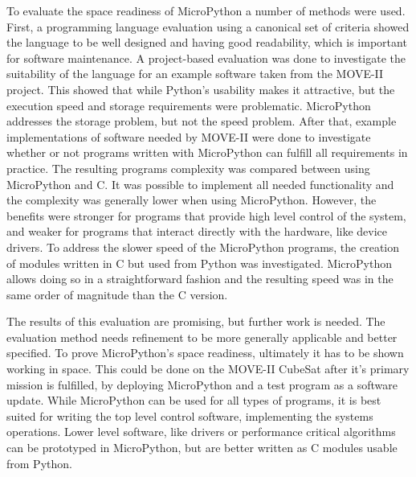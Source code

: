 To evaluate the space readiness of MicroPython a number of methods were used. First, a programming language evaluation using a canonical set of criteria showed the language to be well designed and having good readability, which is important for software maintenance. A project-based evaluation was done to investigate the suitability of the language for an example software taken from the MOVE-II project. This showed that while Python's usability makes it attractive, but the execution speed and storage requirements were problematic. MicroPython addresses the storage problem, but not the speed problem. After that, example implementations of software needed by MOVE-II were done to investigate whether or not programs written with MicroPython can fulfill all requirements in practice. The resulting programs complexity was compared between using MicroPython and C. It was possible to implement all needed functionality and the complexity was generally lower when using MicroPython. However, the benefits were stronger for programs that provide high level control of the system, and weaker for programs that interact directly with the hardware, like device drivers. To address the slower speed of the MicroPython programs, the creation of modules written in C but used from Python was investigated. MicroPython allows doing so in a straightforward fashion and the resulting speed was in the same order of magnitude than the C version.

The results of this evaluation are promising, but further work is needed. The evaluation method needs refinement to be more generally applicable and better specified. To prove MicroPython's space readiness, ultimately it has to be shown working in space. This could be done on the MOVE-II CubeSat after it's primary mission is fulfilled, by deploying MicroPython and a test program as a software update. While MicroPython can be used for all types of programs, it is best suited for writing the top level control software, implementing the systems operations. Lower level software, like drivers or performance critical algorithms can be prototyped in MicroPython, but are better written as C modules usable from Python.
